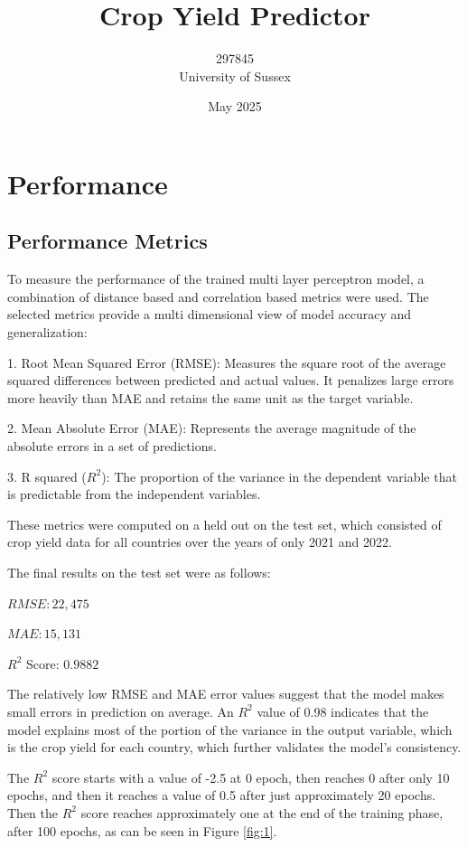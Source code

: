 \documentclass[a4paper, 12pt]{article}
\title{Crop Yield Predictor}
\author{297845 \\ University of Sussex}
\date{May 2025}
\begin{document}
\maketitle

\listoffigures     %


\section{Performance}
\subsection{Performance Metrics}
To measure the performance of the trained multi layer perceptron model, a combination of distance based and correlation based metrics were used. The selected metrics provide a multi dimensional view of model accuracy and generalization:

1. Root Mean Squared Error (RMSE): Measures the square root of the average squared differences between predicted and actual values. It penalizes large errors more heavily than MAE and retains the same unit as the target variable.

2. Mean Absolute Error (MAE): Represents the average magnitude of the absolute errors in a set of predictions.

3. R squared ($R^2$): The proportion of the variance in the dependent variable that is predictable from the independent variables.

These metrics were computed on a held out on the test set, which consisted of crop yield data for all countries over the years of only 2021 and 2022.

The final results on the test set were as follows:

$RMSE: 22,475$

$MAE: 15,131$

$R^2$ Score: $0.9882$

The relatively low RMSE and MAE error values suggest that the model makes small errors in prediction on average. An $R^2$ value of 0.98 indicates that the model explains most of the portion of the variance in the output variable, which is the crop yield for each country, which further validates the model’s consistency.

The $R^2$ score starts with a value of -2.5 at 0 epoch, then reaches 0 after only 10 epochs, and then it reaches a value of 0.5 after just approximately 20 epochs. Then the $R^2$ score reaches approximately one at the end of the training phase, after 100 epochs, as can be seen in Figure \ref{fig:1}.
\end{document}
